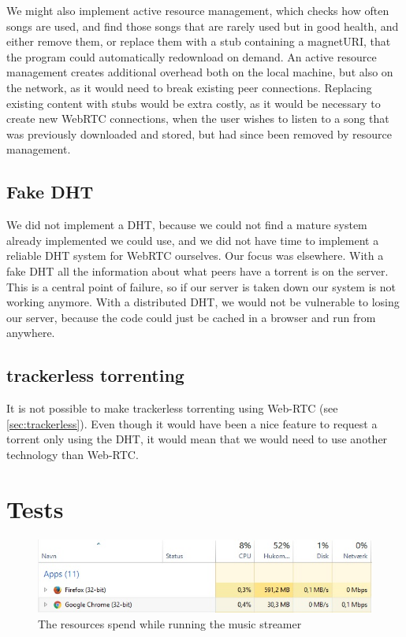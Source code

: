 We might also implement active resource management, which checks how often songs are used,
and find those songs that are rarely used but in good health, and either remove them,
or replace them with a stub containing a magnetURI, 
that the program could automatically redownload on demand.
An active resource management creates additional overhead both on the local machine,
but also on the network, as it would need to break existing peer connections.
Replacing existing content with stubs would be extra costly,
as it would be necessary to create new WebRTC connections,
when the user wishes to listen to a song that was previously downloaded and stored,
but had since been removed by resource management.

\subsection{Fake \acs{DHT}}
We did not implement a DHT, 
because we could not find a mature system already implemented we could use, 
and we did not have time to implement a reliable DHT system for WebRTC ourselves.
Our focus was elsewhere.
With a fake \acs{DHT} all the information about what peers have a torrent is on the server. 
This is a central point of failure, so if our server is taken down our system is not working anymore.
With a distributed \acs{DHT}, 
we would not be vulnerable to losing our server, 
because the code could just be cached in a browser and run from anywhere.

\subsection{trackerless torrenting}
It is not possible to make trackerless torrenting using Web-RTC (see \ref{sec:trackerless}). 
Even though it would have been a nice feature to request a torrent only using the \acs{DHT},
it would mean that we would need to use another technology than Web-RTC.

\section{Tests}
\begin{figure}[H]
	\centering
	\includegraphics[scale=0.8]{gfx/streamerIdle}
	\caption{The resources spend while running the music streamer}
	\label{fig:streamer-idle}
\end{figure}

